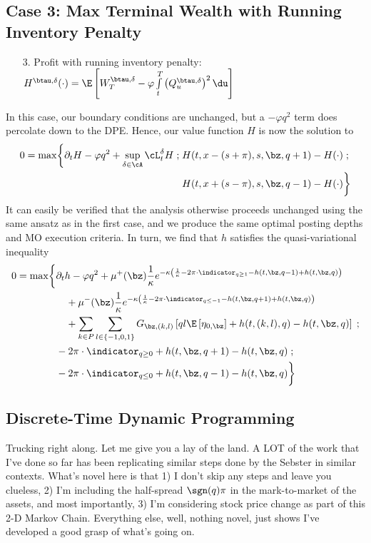 \documentclass[12pt]{article}
\begin{document}
\subsection*{Case 3: Max Terminal Wealth with Running Inventory Penalty}
\begin{enumerate}[noitemsep, topsep=0pt]
\item[3.] Profit with running inventory penalty: $H^{\btau, \delta}(\cdot) = \E \left[  W_T^{\btau, \delta}  - \varphi \int\limits_t^T \left( Q^{\btau, \delta}_u \right)^2 \du  \right]$
\end{enumerate}
In this case, our boundary conditions are unchanged, but a $-\varphi q^2$ term does percolate down to the DPE. Hence, our value function $H$ is now the solution to
\begin{equation}
\label{eq:DPEcase3}
\begin{split}
0 = \max \biggl\lbrace \partial_t H - \varphi q^2 + \sup \limits_{\delta \in \cA} \cL^{\delta}_t H \; ; \; & H(t,x-(s+\pi), s, \bz, q+1) - H(\cdot) \; ; \\
&  H(t,x+(s-\pi), s, \bz, q-1) - H(\cdot) \biggr\rbrace
\end{split}
\end{equation}
It can easily be verified that the analysis otherwise proceeds unchanged using the same ansatz as in the first case, and we produce the same optimal posting depths and MO execution criteria. In turn, we find that $h$ satisfies the quasi-variational inequality
\begin{equation}\label{eq:PDEcase3}
\begin{split}
0 = \max \biggl\lbrace & \partial_t h -\varphi q^2 + \mu^+(\bz) \frac{1}{\kappa} e^{ -\kappa \left( \frac{1}{\kappa} - 2 \pi \cdot \indicator_{q \geq 1} - h(t,\bz,q-1) + h(t,\bz,q)  \right)} \\
& \quad + \mu^-(\bz) \frac{1}{\kappa} e^{ -\kappa \left( \frac{1}{\kappa} - 2 \pi \cdot \indicator_{q \leq -1} - h(t,\bz,q+1) + h(t,\bz,q) \right)} \\
& \quad + \sum_{k\in P} \sum_{l \in \{-1,0,1\}} G_{\bz,(k,l)} \left[ ql \E \left[ \eta_{0,\bz} \right] + h(t,(k,l),q) - h(t,\bz,q) \right] \; ; \\
& -2 \pi \cdot \indicator_{q \geq 0} + h(t, \bz, q+1) - h(t,\bz,q)   \; ; \\
& -2 \pi \cdot \indicator_{q \leq 0} + h(t, \bz, q-1) - h(t,\bz,q)  \biggr\rbrace
\end{split}
\end{equation}

\subsection*{Discrete-Time Dynamic Programming}
Trucking right along. Let me give you a lay of the land. A LOT of the work that I've done so far has been replicating similar steps done by the Sebster in similar contexts. What's novel here is that 1) I don't skip any steps and leave you clueless, 2) I'm including the half-spread $\sgn(q)\pi$ in the mark-to-market of the assets, and most importantly, 3) I'm considering stock price change as part of this 2-D Markov Chain. Everything else, well, nothing novel, just shows I've developed a good grasp of what's going on.
\end{document}
